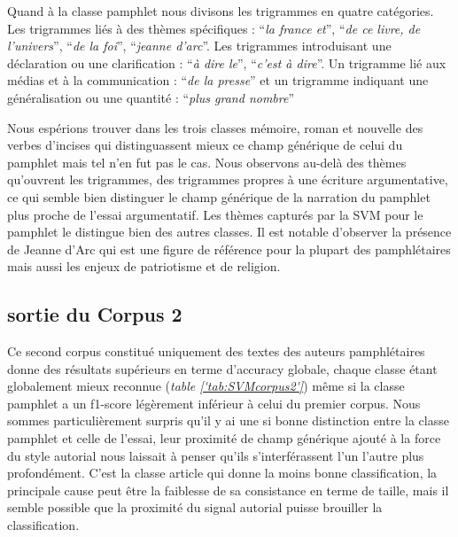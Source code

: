 Quand à la classe pamphlet nous divisons les trigrammes en quatre catégories. Les trigrammes liés à des thèmes spécifiques :
\enquote{\textit{la france et}}, \enquote{\textit{de ce livre, de l'univers}}, \enquote{\textit{de la foi}}, \enquote{\textit{jeanne d'arc}}.
Les trigrammes introduisant une déclaration ou une clarification :
\enquote{\textit{à dire le}}, \enquote{\textit{c'est à dire}}.
Un trigramme lié aux médias et à la communication :
\enquote{\textit{de la presse}} et un trigramme indiquant une généralisation ou une quantité :
\enquote{\textit{plus grand nombre}}

Nous espérions trouver dans les trois classes mémoire, roman et nouvelle des verbes d'incises qui distinguassent mieux ce champ générique de celui du pamphlet mais tel n'en fut pas le cas. Nous observons au-delà des thèmes qu'ouvrent les trigrammes, des trigrammes propres à une écriture argumentative, ce qui semble bien distinguer le champ générique de la narration du pamphlet plus proche de l'essai argumentatif. Les thèmes capturés par la SVM pour le pamphlet le distingue bien des autres classes. Il est notable d'observer la présence de Jeanne d'Arc qui est une figure de référence pour la plupart des pamphlétaires mais aussi les enjeux de patriotisme et de religion.




\subsection{sortie du Corpus 2}

Ce second corpus constitué uniquement des textes des auteurs pamphlétaires donne des résultats supérieurs en terme d'accuracy globale, chaque classe étant globalement mieux reconnue (\textit{table \ref{'tab:SVMcorpus2'}}) même si la classe pamphlet a un f1-score légèrement inférieur à celui du premier corpus. Nous sommes particulièrement surpris qu'il y ai une si bonne distinction entre la classe pamphlet et celle de l'essai, leur proximité de champ générique ajouté à la force du style autorial nous laissait à penser qu'ils s'interférassent l'un l'autre plus profondément. C'est la classe article qui donne la moins bonne classification, la principale cause peut être la faiblesse de sa consistance en terme de taille, mais il semble possible que la proximité du signal autorial puisse brouiller la classification.

